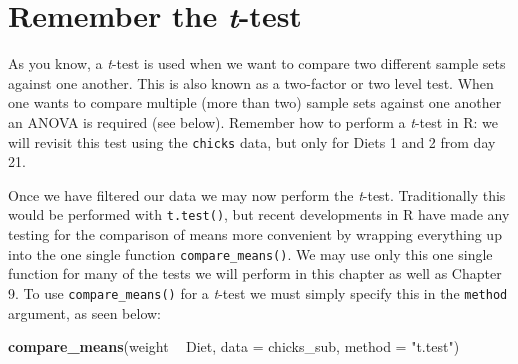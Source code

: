 \documentclass[english,10pt,a4paper,oneside]{book}
\newenvironment{Shaded}{\begin{snugshade}}{\end{snugshade}}
\newcommand{\CommentTok}[1]{\textcolor[rgb]{0.56,0.35,0.01}{\textit{#1}}}
\newcommand{\DataTypeTok}[1]{\textcolor[rgb]{0.13,0.29,0.53}{#1}}
\newcommand{\DecValTok}[1]{\textcolor[rgb]{0.00,0.00,0.81}{#1}}
\newcommand{\KeywordTok}[1]{\textcolor[rgb]{0.13,0.29,0.53}{\textbf{#1}}}
\newcommand{\NormalTok}[1]{#1}
\newcommand{\OperatorTok}[1]{\textcolor[rgb]{0.81,0.36,0.00}{\textbf{#1}}}
\newcommand{\StringTok}[1]{\textcolor[rgb]{0.31,0.60,0.02}{#1}}
\theoremstyle{definition}
\theoremstyle{definition}
\theoremstyle{definition}
\theoremstyle{remark}
\begin{document}
\hypertarget{remember-the-t-test}{%
\section{\texorpdfstring{Remember the
\emph{t}-test}{Remember the t-test}}\label{remember-the-t-test}}

As you know, a \emph{t}-test is used when we want to compare two
different sample sets against one another. This is also known as a
two-factor or two level test. When one wants to compare multiple (more
than two) sample sets against one another an ANOVA is required (see
below). Remember how to perform a \emph{t}-test in R: we will revisit
this test using the \texttt{chicks} data, but only for Diets 1 and 2
from day 21.

\begin{Shaded}
\end{Shaded}

Once we have filtered our data we may now perform the \emph{t}-test.
Traditionally this would be performed with \texttt{t.test()}, but recent
developments in R have made any testing for the comparison of means more
convenient by wrapping everything up into the one single function
\texttt{compare\_means()}. We may use only this one single function for
many of the tests we will perform in this chapter as well as Chapter 9.
To use \texttt{compare\_means()} for a \emph{t}-test we must simply
specify this in the \texttt{method} argument, as seen below:

\begin{Shaded}
\begin{Highlighting}[]
\KeywordTok{compare_means}\NormalTok{(weight }\OperatorTok{~}\StringTok{ }\NormalTok{Diet, }\DataTypeTok{data =}\NormalTok{ chicks_sub, }\DataTypeTok{method =} \StringTok{"t.test"}\NormalTok{)}
\end{Highlighting}
\end{Shaded}
\end{document}
